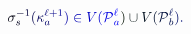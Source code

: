 \documentclass[12pt]{article}
\begin{document}
\makeatletter
\renewcommand*{\@textcolor}[3]{%
  \protect\leavevmode
  \begingroup
    \color#1{#2}#3%
  \endgroup
}
\makeatother
\begin{displaymath}
\mathcolor[RGB]{0,0,15}{\sigma} _ { \mathcolor[RGB]{0,0,30}{s} } ^ { \mathcolor[RGB]{0,0,45}{-} \mathcolor[RGB]{0,0,60}{1} } \mathcolor[RGB]{0,0,75}{(} \mathcolor[RGB]{0,0,90}{\kappa} _ { \mathcolor[RGB]{0,0,105}{a} } ^ { \mathcolor[RGB]{0,0,120}{\ell} \mathcolor[RGB]{0,0,135}{+} \mathcolor[RGB]{0,0,150}{1} } \mathcolor[RGB]{0,0,165}{)} \mathcolor[RGB]{0,0,180}{\in} \mathcolor[RGB]{0,0,195}{V} \mathcolor[RGB]{0,0,210}{(} \mathcal { \mathcolor[RGB]{0,0,225}{P} } _ { \mathcolor[RGB]{0,0,240}{a} } ^ { \mathcolor[RGB]{0,0,255}{\ell} } \mathcolor[RGB]{0,15,0}{)} \mathcolor[RGB]{0,15,15}{\cup} \mathcolor[RGB]{0,15,30}{V} \mathcolor[RGB]{0,15,45}{(} \mathcal { \mathcolor[RGB]{0,15,60}{P} } _ { \mathcolor[RGB]{0,15,75}{b} } ^ { \mathcolor[RGB]{0,15,90}{\ell} } \mathcolor[RGB]{0,15,105}{)} \mathcolor[RGB]{0,15,120}{.}
\end{displaymath}
\end{document}
